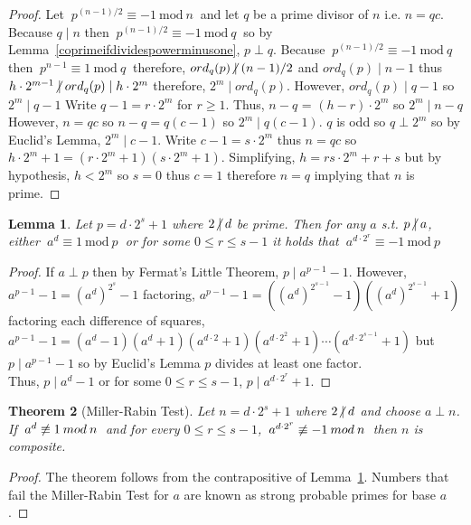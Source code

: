 \documentclass[12pt]{extarticle}
\newcommand{\divides}{\mid}
\newcommand{\ndivides}{\centernot \mid}
\newtheorem{theorem}{Theorem}[section]
\newtheorem{lemma}[theorem]{Lemma}
\renewcommand{\mod}[3]{\: #1 \equiv #2 \: \mathrm{mod} \: #3 \:}
\newcommand{\nmod}[3]{\: #1 \centernot \equiv #2 \: mod \: #3 \:}
\begin{document}
\begin{proof}
Let $\mod{p^{(n-1)/2}}{-1}{n}$ and let $q$ be a prime divisor of $n$ i.e. $n = qc$. Because $q \divides n$ then $\mod{p^{(n-1)/2}}{-1}{q}$ so by Lemma~\ref{coprimeifdividespowerminusone}, $p \perp q$. Because $\mod{p^{(n-1)/2}}{-1}{q}$ then $\mod{p^{n-1}}{1}{q}$ therefore, $ord_q(p) \ndivides (n-1)/2$ and $ord_q(p) \divides n-1$ thus \\ $h \cdot 2^{m-1} \ndivides ord_q(p) \divides h \cdot 2^m$ therefore, $2^m \divides ord_q(p)$. However, $ord_q(p) \divides q-1$ so $2^m \divides q-1$ Write $q - 1 = r \cdot 2^m$ for $ r \ge 1$. Thus, $n - q$ = $(h-r) \cdot 2^m$ so $2^m \divides n - q$ However, $n = qc$ so $n - q = q(c-1)$ so $ 2^m \divides q(c-1)$. $q$ is odd so $q \perp 2^m$ so by Euclid's Lemma, $2^m \divides c-1$. Write $c - 1 = s \cdot 2^m$ thus $n = qc$ so $h \cdot 2^m + 1 = (r \cdot 2^m + 1)(s \cdot 2^m + 1)$. Simplifying, $h = rs \cdot 2^m + r + s$ but by hypothesis, $h < 2^m$ so $s = 0$ thus $c = 1$ therefore $n = q$ implying that $n$ is prime.
\end{proof}

\begin{lemma}
\label{primesarestrongcriteria}
Let $p = d \cdot 2^s + 1$ where $2 \ndivides d$ be prime. Then for any $a$ s.t. $p \ndivides a$, \\ either $\mod{a^d}{1}{p}$ or for some $0 \le r \le s-1$ it holds that $\mod{a^{d \cdot 2^r}}{-1}{p}$
\end{lemma}

\begin{proof}
If $a \perp p$ then by Fermat's Little Theorem, $p \divides a^{p-1} - 1$. However, \\ $a^{p-1} - 1 = (a^d)^{2^s} - 1$ factoring, $a^{p-1} - 1 = ((a^d)^{2^{s-1}} - 1)((a^d)^{2^{s-1}} + 1)$ factoring each difference of squares, $a^{p-1} - 1 = (a^d - 1)(a^d + 1)(a^{d \cdot 2} + 1)(a^{d \cdot 2^2} + 1) \cdots (a^{d \cdot 2^{s-1}} + 1)$ but $p \divides a^{p-1} - 1$ so  by Euclid's Lemma $p$ divides at least one factor. \\ Thus, $p \divides a^d - 1$ or for some $0 \le r \le s-1$, $p \divides a^{d \cdot 2^r} + 1$. 
\end{proof}

\begin{theorem}[Miller-Rabin Test]
Let $n = d \cdot 2^s + 1$ where $2 \ndivides d$ and choose $a \perp n$.\\ If $\nmod{a^d}{1}{n}$ and for every $0 \le r \le s-1$, $\nmod{a^{d \cdot 2^r}}{-1}{n}$ then $n$ is composite.
\end{theorem}

\begin{proof}
The theorem follows from the contrapositive of Lemma~\ref{primesarestrongcriteria}. Numbers that fail the Miller-Rabin Test for $a$ are known as strong probable primes for base $a$. 
\end{proof}
\end{document}
